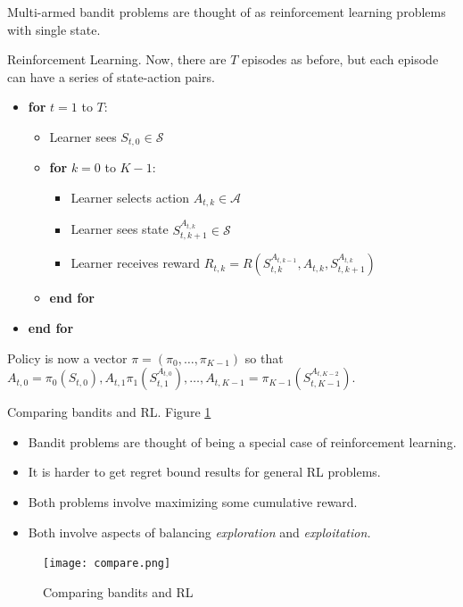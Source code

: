 \documentclass[english]{article}
\begin{document}
\medskip
Multi-armed bandit problems are thought of as reinforcement learning problems with single state.



\item {Reinforcement Learning}. 
Now, there are $T$ episodes as before, but each episode can have a series of state-action pairs. 
\begin{itemize}
    \item[] \textbf{for} $t = 1$ to $T$:
    \begin{itemize}
        \item[] Learner sees $S_{t,0} \in \mathcal{S}$
        \item[] \textbf{for} $k = 0$ to $K-1$:
        \begin{itemize}
        \item[] Learner selects action $A_{t,k} \in \mathcal{A}$ 
        \item[] Learner sees state $S_{t,k+1}^{A_{t,k}} \in \mathcal{S}$
        \item[] Learner receives reward $R_{t,k} = R(S_{t,k}^{A_{t,k-1}}, A_{t, k}, S_{t,k+1}^{A_{t,k}})$
        \end{itemize}
        \item[] \textbf{end for}
    \end{itemize}
    \item[] \textbf{end for}
\end{itemize}
Policy is now a vector $\pi = (\pi_0, \dots, \pi_{K-1})$ so that
$A_{t,0} = \pi_0(S_{t,0}), A_{t,1}\pi_1(S_{t,1}^{A_{t,0}}), \dots, A_{t, K-1} = \pi_{K-1}(S_{t,K-1}^{A_{t,K-2}})$.




\item Comparing bandits and RL. Figure \ref{Comparing bandits and RL} 
\begin{itemize}
    \item Bandit problems are thought of being a special case of reinforcement learning.
    \item It is harder to get regret bound results for general RL problems.
    \item Both problems involve maximizing some cumulative reward.
    \item Both involve aspects of balancing \textit{exploration} and \textit{exploitation.}
\end{itemize}

    \begin{figure}
        \centering
\texttt{[image: compare.png]}
\caption{Comparing bandits and RL}
\label{Comparing bandits and RL}
    \end{figure}
\end{document}
